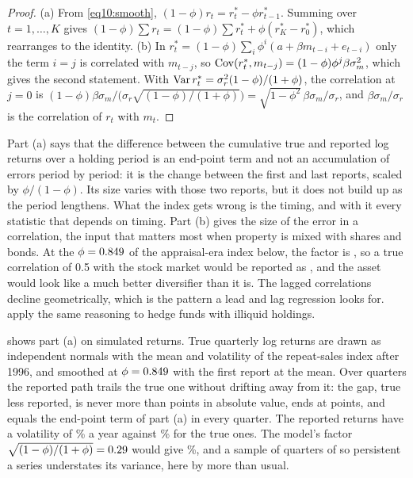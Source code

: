 \begin{chapterrefs}
\begin{proof}
(a) From \cref{eq10:smooth}, $(1-\phi)r_t=r^*_t-\phi r^*_{t-1}$. Summing over $t=1,\dots,K$ gives
$(1-\phi)\sum r_t=(1-\phi)\sum r^*_t+\phi(r^*_K-r^*_0)$, which rearranges to the identity.
(b) In $r^*_t=(1-\phi)\sum_i\phi^i(a+\beta m_{t-i}+e_{t-i})$ only the term $i=j$ is correlated with
$m_{t-j}$, so $\operatorname{Cov}(r^*_t,m_{t-j})=(1-\phi)\phi^j\beta\sigma_m^2$, which gives the second statement.
With $\operatorname{Var} r^*_t=\sigma_r^2(1-\phi)/(1+\phi)$, the correlation at $j=0$ is
$(1-\phi)\beta\sigma_m/\bigl(\sigma_r\sqrt{(1-\phi)/(1+\phi)}\bigr)=\sqrt{1-\phi^2}\,\beta\sigma_m/\sigma_r$,
and $\beta\sigma_m/\sigma_r$ is the correlation of $r_t$ with $m_t$.
\end{proof}

Part (a) says that the difference between the cumulative true and reported log returns over a holding
period is an end-point term and not an accumulation of errors period by period: it is the change between
the first and last reports, scaled by $\phi/(1-\phi)$. Its size varies with those two reports, but it
does not build up as the period lengthens. What
the index gets wrong is the timing, and with it every statistic that depends on timing. Part (b) gives
the size of the error in a correlation, the input that matters most when property is mixed with shares
and bonds. At the $\phi=0.849$ of the appraisal-era index below, the factor is
\smCorrShrink, so a true correlation of 0.5 with the stock market would be reported as \smCorrHalf, and the asset would look like a much better diversifier than it is. The
lagged correlations decline geometrically, which is the pattern a lead and lag regression looks for.
\textcite{getmansky2004} apply the same reasoning to hedge funds with illiquid holdings.

 shows part (a) on simulated returns. True quarterly log returns are
drawn as independent normals with the mean and volatility of the repeat-sales index after 1996, and
smoothed at $\phi=0.849$ with the first report at the mean. Over \ssQ{} quarters the reported path
trails the true one without drifting away from it: the gap, true less reported, is never more than
\ssGapMax{} points in absolute value, ends at \ssGapEnd{} points, and equals the end-point term of part (a)
in every quarter. The reported returns have a volatility of \ssVolRep\% a year against \ssVolTrue\% for the
true ones. The model's factor $\sqrt{(1-\phi)/(1+\phi)}=0.29$ would give \ssVolModel\%, and a
sample of \ssQ{} quarters of so persistent a series understates its variance, here by more than usual.


\end{chapterrefs}
